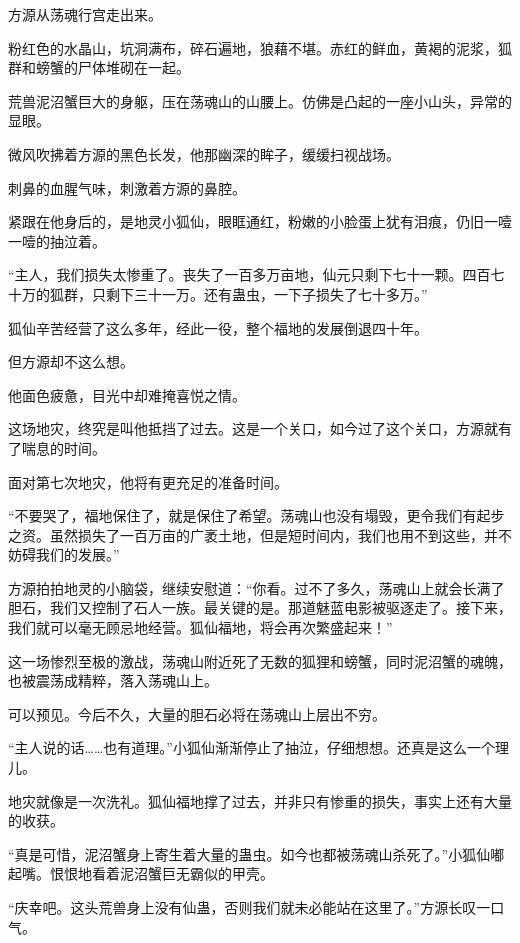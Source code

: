 
\begin{this_body}

方源从荡魂行宫走出来。

粉红色的水晶山，坑洞满布，碎石遍地，狼藉不堪。赤红的鲜血，黄褐的泥浆，狐群和螃蟹的尸体堆砌在一起。

荒兽泥沼蟹巨大的身躯，压在荡魂山的山腰上。仿佛是凸起的一座小山头，异常的显眼。

微风吹拂着方源的黑色长发，他那幽深的眸子，缓缓扫视战场。

刺鼻的血腥气味，刺激着方源的鼻腔。

紧跟在他身后的，是地灵小狐仙，眼眶通红，粉嫩的小脸蛋上犹有泪痕，仍旧一噎一噎的抽泣着。

“主人，我们损失太惨重了。丧失了一百多万亩地，仙元只剩下七十一颗。四百七十万的狐群，只剩下三十一万。还有蛊虫，一下子损失了七十多万。”

狐仙辛苦经营了这么多年，经此一役，整个福地的发展倒退四十年。

但方源却不这么想。

他面色疲惫，目光中却难掩喜悦之情。

这场地灾，终究是叫他抵挡了过去。这是一个关口，如今过了这个关口，方源就有了喘息的时间。

面对第七次地灾，他将有更充足的准备时间。

“不要哭了，福地保住了，就是保住了希望。荡魂山也没有塌毁，更令我们有起步之资。虽然损失了一百万亩的广袤土地，但是短时间内，我们也用不到这些，并不妨碍我们的发展。”

方源拍拍地灵的小脑袋，继续安慰道：“你看。过不了多久，荡魂山上就会长满了胆石，我们又控制了石人一族。最关键的是。那道魅蓝电影被驱逐走了。接下来，我们就可以毫无顾忌地经营。狐仙福地，将会再次繁盛起来！”

这一场惨烈至极的激战，荡魂山附近死了无数的狐狸和螃蟹，同时泥沼蟹的魂魄，也被震荡成精粹，落入荡魂山上。

可以预见。今后不久，大量的胆石必将在荡魂山上层出不穷。

“主人说的话……也有道理。”小狐仙渐渐停止了抽泣，仔细想想。还真是这么一个理儿。

地灾就像是一次洗礼。狐仙福地撑了过去，并非只有惨重的损失，事实上还有大量的收获。

“真是可惜，泥沼蟹身上寄生着大量的蛊虫。如今也都被荡魂山杀死了。”小狐仙嘟起嘴。恨恨地看着泥沼蟹巨无霸似的甲壳。

“庆幸吧。这头荒兽身上没有仙蛊，否则我们就未必能站在这里了。”方源长叹一口气。


\end{this_body}
